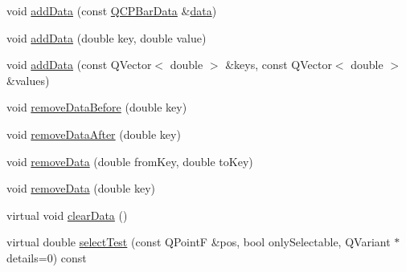 \begin{DoxyCompactItemize}
\item 
void \hyperlink{class_q_c_p_bars_a142158b1addefd53259002dd3ab22c3a}{add\-Data} (const \hyperlink{class_q_c_p_bar_data}{Q\-C\-P\-Bar\-Data} \&\hyperlink{class_q_c_p_bars_ac05c21de37f677545d06fd852ef8a743}{data})
\item 
void \hyperlink{class_q_c_p_bars_a684dd105403a5497fda42f2094fecbb7}{add\-Data} (double key, double value)
\item 
void \hyperlink{class_q_c_p_bars_a3679a0a9decab0fa03f8f4c6e3344d52}{add\-Data} (const Q\-Vector$<$ double $>$ \&keys, const Q\-Vector$<$ double $>$ \&values)
\item 
void \hyperlink{class_q_c_p_bars_a9d12779a3fad4820aad2c428f368298d}{remove\-Data\-Before} (double key)
\item 
void \hyperlink{class_q_c_p_bars_a99de6e7abbbf03fb41fa604c7f08aa8b}{remove\-Data\-After} (double key)
\item 
void \hyperlink{class_q_c_p_bars_a1fe9bcb57d670defea1bb65cadf43765}{remove\-Data} (double from\-Key, double to\-Key)
\item 
void \hyperlink{class_q_c_p_bars_a837cc9848ad3edd40a6130b508493f93}{remove\-Data} (double key)
\item 
virtual void \hyperlink{class_q_c_p_bars_a11dbbd707132f07f862dff13c5789c2b}{clear\-Data} ()
\item 
virtual double \hyperlink{class_q_c_p_bars_a0d37a9feb1d0baf73ce6e809db214445}{select\-Test} (const Q\-Point\-F \&pos, bool only\-Selectable, Q\-Variant $\ast$details=0) const 
\end{DoxyCompactItemize}
